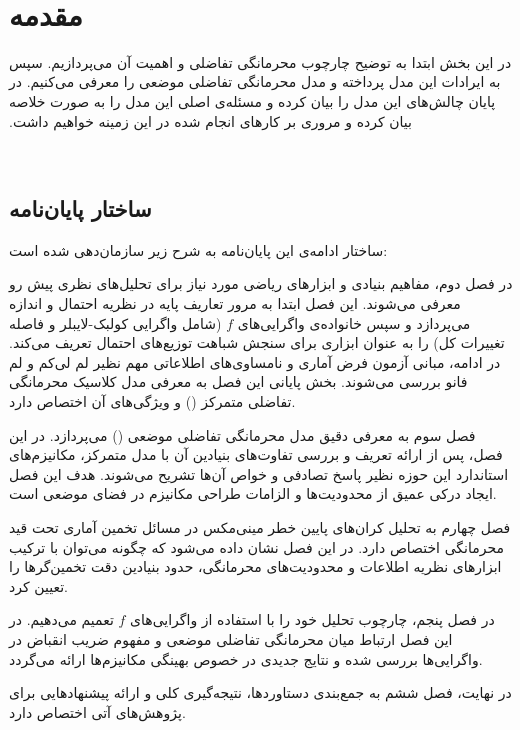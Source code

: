 ‫
‫\chapter{مقدمه}
‫در این بخش ابتدا به توضیح چارچوب محرمانگی تفاضلی و اهمیت آن می‌پردازیم. سپس به ایرادات این مدل پرداخته و مدل محرمانگی تفاضلی موضعی را معرفی می‌کنیم. در پایان چالش‌های این مدل را بیان کرده و مسئله‌ی اصلی این مدل را به صورت خلاصه بیان کرده و مروری بر کارهای انجام شده در این زمینه خواهیم داشت.
‫

‫


\section{ساختار پایان‌نامه}
\label{sec:intro:structure}

ساختار ادامه‌ی این پایان‌نامه به شرح زیر سازمان‌دهی شده است:

در فصل دوم، مفاهیم بنیادی و ابزارهای ریاضی مورد نیاز برای تحلیل‌های نظری پیش‌ رو معرفی می‌شوند. این فصل ابتدا به مرور تعاریف پایه در نظریه احتمال و اندازه می‌پردازد و سپس خانواده‌ی واگرایی‌های $f$ (شامل واگرایی کولبک-لایبلر و فاصله تغییرات کل) را به عنوان ابزاری برای سنجش شباهت توزیع‌های احتمال تعریف می‌کند. در ادامه، مبانی آزمون فرض آماری و نامساوی‌های اطلاعاتی مهم نظیر لم لی‌کم و لم فانو بررسی می‌شوند. بخش پایانی این فصل به معرفی مدل کلاسیک محرمانگی تفاضلی متمرکز () و ویژگی‌های آن اختصاص دارد.

فصل سوم به معرفی دقیق مدل محرمانگی تفاضلی موضعی () می‌پردازد. در این فصل، پس از ارائه تعریف و بررسی تفاوت‌های بنیادین آن با مدل متمرکز، مکانیزم‌های استاندارد این حوزه نظیر پاسخ تصادفی و خواص آن‌ها تشریح می‌شوند. هدف این فصل ایجاد درکی عمیق از محدودیت‌ها و الزامات طراحی مکانیزم در فضای موضعی است.

فصل چهارم به تحلیل کران‌های پایین خطر مینی‌مکس در مسائل تخمین آماری تحت قید محرمانگی اختصاص دارد. در این فصل نشان داده می‌شود که چگونه می‌توان با ترکیب ابزارهای نظریه اطلاعات و محدودیت‌های محرمانگی، حدود بنیادین دقت تخمین‌گرها را تعیین کرد.

در فصل پنجم، چارچوب تحلیل خود را با استفاده از واگرایی‌های $f$ تعمیم می‌دهیم. در این فصل ارتباط میان محرمانگی تفاضلی موضعی و مفهوم ضریب انقباض در واگرایی‌ها بررسی شده و نتایج جدیدی در خصوص بهینگی مکانیزم‌ها ارائه می‌گردد.

در نهایت، فصل ششم به جمع‌بندی دستاوردها، نتیجه‌گیری کلی و ارائه پیشنهادهایی برای پژوهش‌های آتی اختصاص دارد.